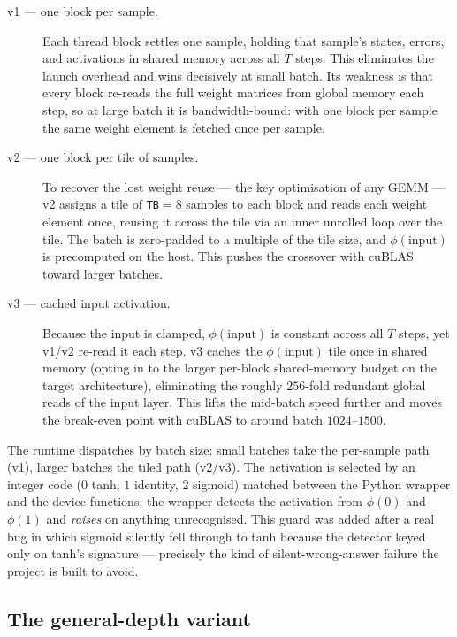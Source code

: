 \begin{description}
  \item[v1 --- one block per sample.] Each thread block settles one sample, holding that sample's
  states, errors, and activations in shared memory across all $T$ steps. This eliminates the launch
  overhead and wins decisively at small batch. Its weakness is that every block re-reads the full
  weight matrices from global memory each step, so at large batch it is bandwidth-bound: with one block
  per sample the same weight element is fetched once per sample.
  \item[v2 --- one block per tile of samples.] To recover the lost weight reuse --- the key optimisation
  of any GEMM --- v2 assigns a tile of \texttt{TB}$=8$ samples to each block and reads each weight
  element once, reusing it across the tile via an inner unrolled loop over the tile. The batch is
  zero-padded to a multiple of the tile size, and $\phi(\text{input})$ is precomputed on the host. This
  pushes the crossover with cuBLAS toward larger batches.
  \item[v3 --- cached input activation.] Because the input is clamped, $\phi(\text{input})$ is constant
  across all $T$ steps, yet v1/v2 re-read it each step. v3 caches the $\phi(\text{input})$ tile once in
  shared memory (opting in to the larger per-block shared-memory budget on the target architecture),
  eliminating the roughly $256$-fold redundant global reads of the input layer. This lifts the
  mid-batch speed further and moves the break-even point with cuBLAS to around batch $1024$--$1500$.
\end{description}

The runtime dispatches by batch size: small batches take the per-sample path (v1), larger batches the
tiled path (v2/v3). The activation is selected by an integer code ($0$ tanh, $1$ identity, $2$ sigmoid)
matched between the Python wrapper and the device functions; the wrapper detects the activation from
$\phi(0)$ and $\phi(1)$ and \emph{raises} on anything unrecognised. This guard was added after a real
bug in which sigmoid silently fell through to tanh because the detector keyed only on tanh's signature
--- precisely the kind of silent-wrong-answer failure the project is built to avoid.

\subsection{The general-depth variant}

